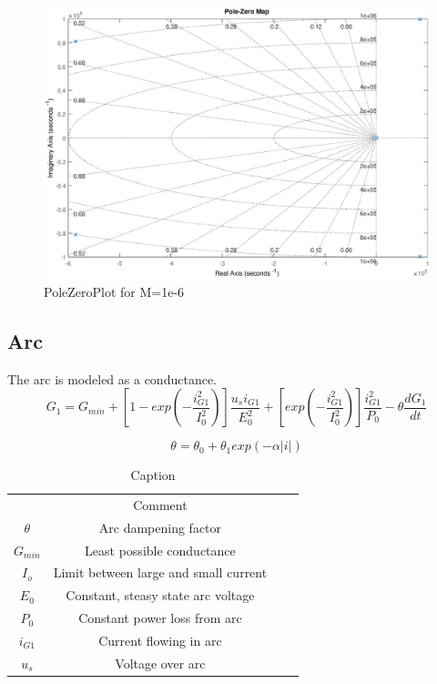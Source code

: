 \begin{figure}
    \centering
    \includegraphics[width=\textwidth]{img/PoleZeroPlot.eps}
    \caption{PoleZeroPlot for M=1e-6}
    \label{fig:my_label}
\end{figure}

\subsection{Arc}
The arc is modeled as a conductance.
\begin{equation} \label{eq:g1}
    G_1 = G_{min} + [ 1 - exp(-\frac{i_{G1}^2}{I_0^2})] \frac{u_s i_{G1}}{E_0^2} + [exp(-\frac{i_{G1}^2}{I_0^2})] \frac{i_{G1}^2}{P_0} - \theta \frac{d G_1}{dt}
\end{equation}

\begin{equation}
    \theta = \theta_0 + \theta_1 exp(-\alpha |i|)
\end{equation}

\begin{table}[]
    \centering
    \begin{tabular}{c|c|c|c}
         & Comment &  &\\
        $\theta$  & Arc dampening factor &  &\\
        $G_{min}$ & Least possible conductance &  &\\
        $I_o$     & Limit between large and small current &  &\\
        $E_0$     & Constant, steasy state arc voltage &  &\\
        $P_0$     & Constant power loss from arc &  & \\
        $i_{G1}$ & Current flowing in arc      &  & \\
        $u_s$     & Voltage over arc            &  &
    \end{tabular}
    \caption{Caption}
    \label{tab:my_label}
\end{table}
